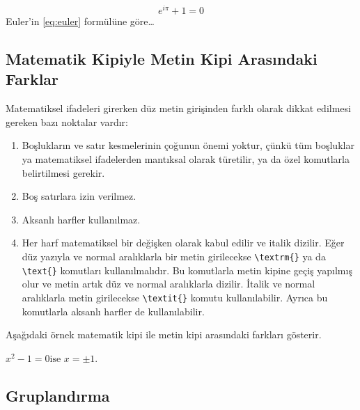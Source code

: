 \documentclass[
  10pt,
]{scrbook}
\newenvironment{Shaded}{\begin{snugshade}}{\end{snugshade}}
\newcommand{\NormalTok}[1]{#1}
\newcommand{\SpecialCharTok}[1]{\textcolor[rgb]{0.00,0.00,0.00}{#1}}
\newcommand{\SpecialStringTok}[1]{\textcolor[rgb]{0.31,0.60,0.02}{#1}}
\providecommand{\tightlist}{%
  \setlength{\itemsep}{0pt}\setlength{\parskip}{0pt}}
\theoremstyle{definition}
\theoremstyle{definition}
\theoremstyle{definition}
\theoremstyle{definition}
\theoremstyle{remark}
\begin{document}
\begin{equation}
 e^{i\pi}+1=0
 \label{eq:euler}
\end{equation} Euler'in \eqref{eq:euler} formülüne göre\ldots{}

\hypertarget{matematik-kipiyle-metin-kipi-arasux131ndaki-farklar}{%
\subsection{Matematik Kipiyle Metin Kipi Arasındaki Farklar}\label{matematik-kipiyle-metin-kipi-arasux131ndaki-farklar}}

Matematiksel ifadeleri girerken düz metin girişinden farklı olarak dikkat edilmesi gereken bazı noktalar vardır:

\begin{enumerate}
\def\labelenumi{\arabic{enumi}.}
\tightlist
\item
  Boşlukların ve satır kesmelerinin çoğunun önemi yoktur, çünkü tüm boşluklar ya matematiksel ifadelerden mantıksal olarak türetilir, ya da özel komutlarla belirtilmesi gerekir.
\item
  Boş satırlara izin verilmez.
\item
  Aksanlı harfler kullanılmaz.
\item
  Her harf matematiksel bir değişken olarak kabul edilir ve italik dizilir. Eğer düz yazıyla ve normal aralıklarla bir metin girilecekse \texttt{\textbackslash{}textrm\{\}} ya da \texttt{\textbackslash{}text\{\}} komutları kullanılmalıdır. Bu komutlarla metin kipine geçiş yapılmış olur ve metin artık düz ve normal aralıklarla dizilir. İtalik ve normal aralıklarla metin girilecekse \texttt{\textbackslash{}textit\{\}} komutu kullanılabilir. Ayrıca bu komutlarla aksanlı harfler de kullanılabilir.
\end{enumerate}

Aşağıdaki örnek matematik kipi ile metin kipi arasındaki farkları gösterir.

\begin{Shaded}
\end{Shaded}

\(x^2-1=0 \text{ise $x=\pm 1$}.\)

\hypertarget{gruplandux131rma}{%
\subsection{Gruplandırma}\label{gruplandux131rma}}
\end{document}
